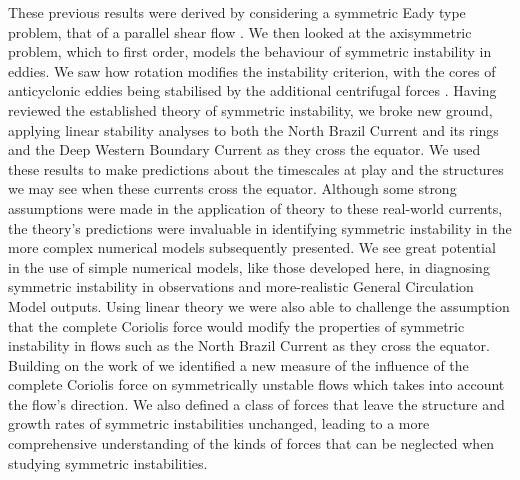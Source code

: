 These previous results were derived by considering a symmetric Eady type problem, that of a parallel shear flow \citep{Eady1949, Ooyama1966, Stone1966, Hoskins1974}. We then looked at the axisymmetric problem, which to first order, models the behaviour of symmetric instability in eddies. We saw how rotation modifies the instability criterion, with the cores of anticyclonic eddies being stabilised by the additional centrifugal forces \citep{Buckingham2021}. Having reviewed the established theory of symmetric instability, we broke new ground, applying linear stability analyses to both the North Brazil Current and its rings and the Deep Western Boundary Current as they cross the equator. We used these results to make predictions about the timescales at play and the structures we may see when these currents cross the equator. Although some strong assumptions were made in the application of theory to these real-world currents, the theory's predictions were invaluable in identifying symmetric instability in the more complex numerical models subsequently presented. We see great potential in the use of simple numerical models, like those developed here, in diagnosing symmetric instability in observations and more-realistic General Circulation Model outputs. Using linear theory we were also able to challenge the assumption that the complete Coriolis force would modify the properties of symmetric instability in flows such as the North Brazil Current as they cross the equator. Building on the work of \citet{Zeitlin2018a} we identified a new measure of the influence of the complete Coriolis force on symmetrically unstable flows which takes into account the flow's direction. We also defined a class of forces that leave the structure and growth rates of symmetric instabilities unchanged, leading to a more comprehensive understanding of the kinds of forces that can be neglected when studying symmetric instabilities.

